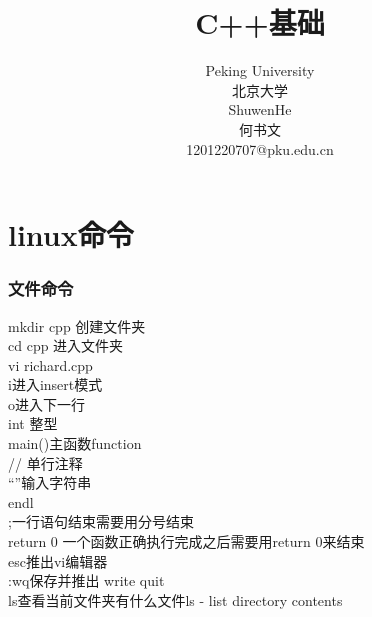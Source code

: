 \documentclass[12pt,twiside,a4paper]{ctexbook}
\numberwithin{chapter}{part}
\begin{document}

\author
{
Peking University\\
北京大学\\
ShuwenHe\\
何书文\\
1201220707@pku.edu.cn
}

\title{C++基础}
\maketitle
\tableofcontents
\pagestyle{fancy}


\chapter{linux命令}
\subsection{文件命令}
mkdir cpp 创建文件夹\\
cd cpp 进入文件夹\\
vi richard.cpp\\
i进入insert模式\\
o进入下一行\\
int 整型\\
main()主函数function\\
// 单行注释\\
“”输入字符串\\
endl\\
;一行语句结束需要用分号结束\\
return 0 一个函数正确执行完成之后需要用return 0来结束\\
esc推出vi编辑器\\
:wq保存并推出 write quit\\
ls查看当前文件夹有什么文件ls - list directory contents
\end{document}
